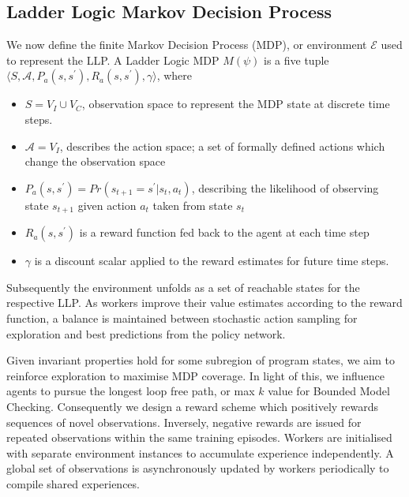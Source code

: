 \documentclass[conference,compsoc]{IEEEtran}
\begin{document}

\subsection{Ladder Logic Markov Decision Process}\label{subsect:MDP}
We now define the finite Markov Decision Process (MDP), or environment $\mathcal{E}$ used to represent the LLP. A Ladder Logic MDP $M(\psi)$ is a five tuple $\langle S,\mathcal{A},P_a(s,s^\prime), R_a(s,s^\prime),\gamma \rangle$, where 
\begin{itemize}
	\item $S = V_I \cup V_C$, observation space to represent the MDP state at discrete time steps.
	\item $\mathcal{A} = V_I$, describes the action space; a set of formally defined actions which change the observation space
	\item $P_a(s,s^\prime) = Pr(s_{t+1} = s^\prime | s_t, a_t)$, describing the likelihood of observing state $s_{t+1}$ given action $a_t$ taken from state $s_t$
	\item $R_a(s,s^\prime)$ is a reward function fed back to the agent at each time step
	\item $\gamma$ is a discount scalar applied to the reward estimates for future time steps.
\end{itemize}

Subsequently the environment unfolds as a set of reachable states for the respective LLP. As workers improve their value estimates according to the reward function, a balance is maintained between stochastic action sampling for exploration and best predictions from the policy network.

Given invariant properties hold for some subregion of program states, we aim to reinforce exploration to maximise MDP coverage. In light of this, we influence agents to pursue the longest loop free path, or max $k$ value for Bounded Model Checking. Consequently we design a reward scheme which positively rewards sequences of novel observations. Inversely, negative rewards are issued for repeated observations within the same training episodes. Workers are initialised with separate environment instances to accumulate experience independently. A global set of observations is asynchronously updated by workers periodically to compile shared experiences.    
\end{document}
